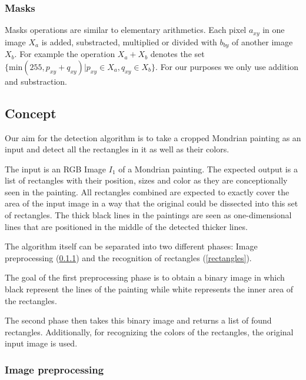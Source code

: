 \documentclass[serif,article,noparskip]{agse-thesis}
\begin{document}
\subsubsection{Masks}

Masks operations are similar to elementary arithmetics. Each pixel $a_{xy}$ in
one image  $X_a$ is added, substracted, multiplied or divided with $b_{by}$ of
another image $X_b$. For example the operation $X_a + X_b$ denotes the set
$\{\mathrm{min}(255, p_{xy} + q_{xy}) | p_{xy} \in X_a, q_{xy} \in X_b\}$. For our purposes we only
use addition and substraction.


\subsection{Concept} \label{concept}


Our aim for the detection algorithm is to take a cropped Mondrian painting as
an input and detect all the rectangles in it as well as their colors.

The input is an RGB Image $I_1$ of a Mondrian painting. The expected output is a
list of rectangles with their position, sizes and color as they are
conceptionally seen in the painting. All rectangles combined are expected to
exactly cover the area of the input image in a way that the original could be
dissected into this set of rectangles. The thick black lines in the paintings
are seen as one-dimensional lines that are positioned in the middle of the
detected thicker lines.

The algorithm itself can be separated into two different phases: Image
preprocessing (\ref{preprocessing}) and the recognition of rectangles (\ref{rectangles}).

The goal of the first preprocessing phase is to obtain a binary image in which
black represent the lines of the painting while white represents the inner area
of the rectangles.

The second phase then takes this binary image and returns a list of found
rectangles. Additionally, for recognizing the colors of the rectangles, the
original input image is used.

\subsubsection{Image preprocessing} \label{preprocessing}
\end{document}
